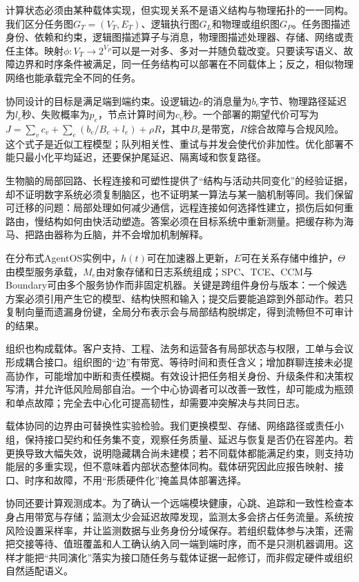 计算状态必须由某种载体实现，但实现关系不是语义结构与物理拓扑的一一同构。我们区分任务图$G_T=(V_T,E_T)$、逻辑执行图$G_L$和物理或组织图$G_P$。任务图描述身份、依赖和约束，逻辑图描述算子与消息，物理图描述处理器、存储、网络或责任主体。映射$\phi:V_T\to2^{V_P}$可以是一对多、多对一并随负载改变。只要读写语义、故障边界和时序条件被满足，同一任务结构可以部署在不同载体上；反之，相似物理网络也能承载完全不同的任务。

协同设计的目标是满足端到端约束。设逻辑边$e$的消息量为$b_e$字节、物理路径延迟为$l_e$秒、失败概率为$p_e$，节点计算时间为$c_v$秒。一个部署的期望代价可写为$J=\sum_v c_v+\sum_e(b_e/B_e+l_e)+\rho R$，其中$B_e$是带宽，$R$综合故障与合规风险。这个式子是近似工程模型；队列相关性、重试与并发会使代价非加性。优化部署不能只最小化平均延迟，还要保护尾延迟、隔离域和恢复路径。

生物脑的局部回路、长程连接和可塑性提供了“结构与活动共同变化”的经验证据，却不证明数字系统必须复制脑区，也不证明某一算法与某一脑机制等同。我们保留可迁移的问题：局部处理如何减少通信，远程连接如何选择性建立，损伤后如何重路由，慢结构如何由快活动塑造。答案必须在目标系统中重新测量。把缓存称为海马、把路由器称为丘脑，并不会增加机制解释。

在分布式AgentOS实例中，$h(t)$可在加速器上更新，$E$可在关系存储中维护，$\Theta$由模型服务承载，$M_e$由对象存储和日志系统组成；SPC、TCE、CCM与Boundary可由多个服务协作而非固定机器。关键是跨组件身份与版本：一个候选方案必须引用产生它的模型、结构快照和输入；提交后要能追踪到外部动作。若只复制向量而遗漏身份键，全局分布表示会与局部结构脱绑定，得到流畅但不可审计的结果。

组织也构成载体。客户支持、工程、法务和运营各有局部状态与权限，工单与会议形成耦合接口。组织图的“边”有带宽、等待时间和责任含义；增加群聊连接未必提高协作，可能增加中断和责任模糊。有效设计把任务相关身份、升级条件和决策权写清，并允许低风险局部自治。一个中心协调者可以改善一致性，却可能成为瓶颈和单点故障；完全去中心化可提高韧性，却需要冲突解决与共同日志。

载体协同的边界由可替换性实验检验。我们更换模型、存储、网络路径或责任小组，保持接口契约和任务集不变，观察任务质量、延迟与恢复是否仍在容差内。若更换导致大幅失效，说明隐藏耦合尚未建模；若不同载体都能满足约束，则支持功能层的多重实现，但不意味着内部状态整体同构。载体研究因此应报告映射、接口、时序和故障，不用“形质硬件化”掩盖具体部署选择。

协同还要计算观测成本。为了确认一个远端模块健康，心跳、追踪和一致性检查本身占用带宽与存储；监测太少会延迟故障发现，监测太多会挤占任务流量。系统按风险设置采样率，并让监测数据与业务身份分域保存。若组织载体参与决策，还需把交接等待、值班覆盖和人工确认纳入同一端到端时序，而不是只测机器调用。这样才能把“共同演化”落实为接口随任务与载体证据一起修订，而非假定硬件或组织自然适配语义。

